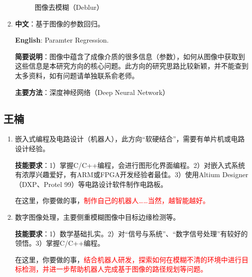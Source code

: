 \documentclass[14pt,a4paper]{extarticle}
\begin{document}
\begin{enumerate}
\begin{figure}[!ht]
  \caption{图像去模糊（Deblur）}
  \label{fig:deblur} %
\end{figure}

\item \textbf{中文}：基于图像的参数回归。

\textbf{English}: Paramter Regression.

\textbf{简要说明}：图像中蕴含了成像介质的很多信息（参数），如何从图像中获取到这些信息是本研究方向的核心问题。此方向的研究思路比较新颖，并不能查到太多资料，如有问题请单独联系俞老师。

\textbf{主要方法}：深度神经网络（Deep Neural Network）
\end{enumerate}

\subsection{王楠}

\begin{enumerate}
\item 嵌入式编程及电路设计（机器人），此方向“软硬结合”，需要有单片机或电路设计经验。

\textbf{技能要求}：1）掌握C/C++编程，会进行图形化界面编程。2）对嵌入式系统有浓厚兴趣爱好，有ARM或FPGA开发经验者最佳。3）使用Altium Designer（DXP、Protel 99）等电路设计软件制作电路板。

在这里，你要做的事，\textcolor{red}{制作自己的机器人……当然，越智能越好。}
\item 数字图像处理，主要侧重模糊图像中目标边缘检测等。

\textbf{技能要求}：1）数学基础扎实。2）对“信号与系统”、“数字信号处理”有较好的领悟。3）掌握C/C++编程。

在这里，你要做的事，\textcolor{red}{结合机器人研发，探索如何在模糊不清的环境中进行目标检测，并进一步帮助机器人完成基于图像的路径规划等问题。}
\end{enumerate}

\end{document}
